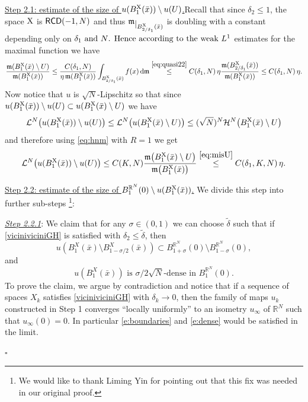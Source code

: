 \documentclass[reqno,11pt]{article}
\numberwithin{equation}{section}
\newcommand{\R}{\mathbb{R}}
\newcommand{\mm}{{\mbox{\boldmath$m$}}}
\renewcommand{\d}{{\mathrm d}}
\newcommand{\restr}[1]{\lower3pt\hbox{$|_{#1}$}}
\renewcommand{\mm}{\mathfrak m}                                %
\renewenvironment{proof}{\removelastskip\par\medskip   %
\noindent{\em Proof} \rm}{\penalty-20\null\hfill$\square$\par\medbreak}
\newcommand{\X}{{\rm X}}
\newcommand{\RCD}{{\sf RCD}}
\newcommand{\HH}{{\mathcal H}}
\begin{document}
\begin{proof}
\underline{Step 2.1: estimate of the size of $u(B_1^\X(\bar x))\setminus u(U)$.}Recall that since  \(\delta_2\le1\), the space \(\X\) is \(\RCD(-1,N)\)  and thus \(\mm\restr{ B^\X_{2/\delta_1}(\bar x)}\) is  doubling with a constant depending only on \(\delta_1$ and $N$. Hence according to the weak  \(L^1\) estimates for the  maximal function  we have
\begin{equation}
\label{eq:misU}
\frac{\mm(B^\X_{1}(\bar x)\setminus U)}{\mm(B_1^\X(\bar x))}\le \frac{C(\delta_1,N)}{\eta\,\mm(B_1^\X(\bar x))} \int_{B^\X_{2/\delta_1}(\bar x)} f(x)\,\d\mm \stackrel{\eqref{eq:quasi22}}\le C(\delta_1,N)\,\eta\frac{ \mm(B_{2/\delta_1}^\X(\bar x))}{\mm(B_1^\X(\bar x))}\le C(\delta_1,N) \,\eta.
\end{equation}
Now notice that    $u$ is $\sqrt N$-Lipschitz so that since  $u(B_1^\X(\bar x))\setminus u(U)\subset u(B_1^\X(\bar x)\setminus U)$ we have
\[
\mathcal L^N\big(u(B_1^\X(\bar x))\setminus u(U)\big)\leq \mathcal L^N\big(u(B_1^\X(\bar x)\setminus U)\big)\leq (\sqrt N)^N\HH^N\big(B_1^\X(\bar x)\setminus U\big)
\]
and therefore using \eqref{eq:hnm} with $R=1$ we get
\begin{equation}
\label{eq:pezzofacile}
\mathcal L^N\big(u(B_1^\X(\bar x))\setminus u(U)\big)\leq C(K,N)  \frac{\mm\big(B_1^\X(\bar x)\setminus U\big)}{\mm\big(B_1^\X(\bar x)\big)}\stackrel{\eqref{eq:misU}}\leq C(\delta_1,K,N)\,\eta.
\end{equation}

\underline{Step 2.2: estimate of the size of $B_1^{\R^N}(0)\setminus u(B_1^\X(\bar x))$.} {We divide this step into  further sub-steps \footnote{{We would like to thank Liming Yin for pointing out that this fix was needed in our original proof.}}:}

{
\underline{\emph{Step 2.2.1}}: We claim that for  any  \(\sigma \in (0,1)\) we can choose \(\tilde{\delta}\) such  that if \eqref{viciniviciniGH} is satisfied with \(\delta_{2}\le \tilde \delta\), then
\begin{equation}\label{e:boundaries}
u(B_{1}^{X}(\bar x)\setminus B_{1-\sigma/2}^{X}(\bar x))\subset B^{\R^{N}}_{1+\sigma}(0)\setminus B^{\R^{N}}_{1-\sigma}(0), 
\end{equation}
and 
\begin{equation}\label{e:dense}
\text{\(u(B_{1}^{X}(\bar x))\) is \(\sigma/2\sqrt{N}\)-dense in \(B^{\R^{N}}_{1}(0)\).}
\end{equation}
To prove the claim, we  argue by contradiction  and notice that if a sequence of spaces \(X_k\) satisfies  \ref{viciniviciniGH} with \(\delta_k\to 0\), then  the family of maps \(u_{k}\) constructed in Step 1 converges ``locally uniformly'' to an isometry \(u_{\infty}\) of  \(\mathbb R^{N}\) such that \(u_{\infty}(0)=0\). In particular \eqref{e:boundaries} and \eqref{e:dense} would be satisfied in the limit.
}



\end{proof}
\end{document}
